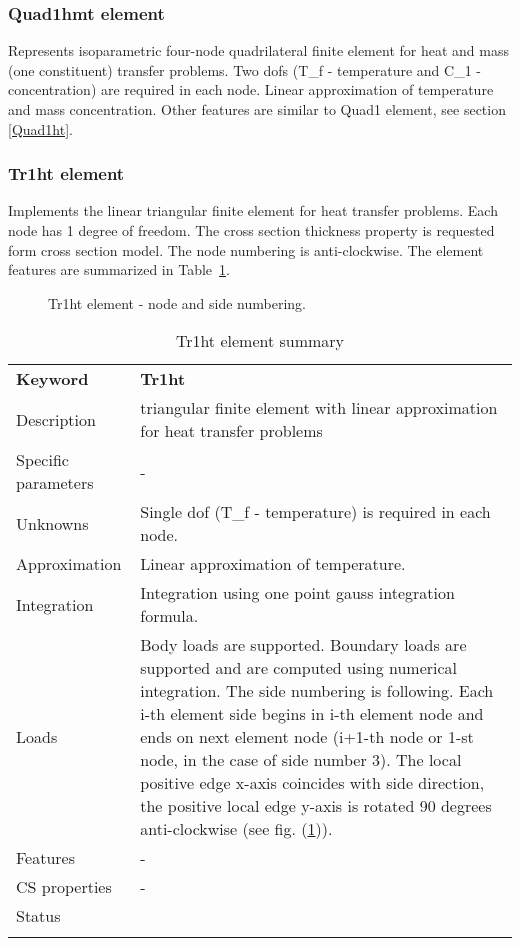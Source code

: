 \documentclass[a4paper]{article}
\newcommand{\param}[1]{\texttt{#1}} %
\newcommand{\templabel}{}%
\newcommand{\tempcaption}{}%
\newcounter{nelpar}
\newenvironment{elementsummary}[5]{%
  \gdef\tempcaption{#4}%
  \gdef\templabel{#5}%
  \setcounter{nelpar}{0}%
  \begin{center} %
    \begin{table}[!htb] %
      \begin{tabular}{|l|p{9cm}|}\hline %
        {\bf Keyword} & \bf{#1}\\ %
        {Description} & {#2}\\ %
        {Specific parameters} & {#3}\\ \hline %
}{
  \\ \hline %
      \end{tabular}%
      \caption{\tempcaption}%
      \label{\templabel}%
    \end{table}%
  \end{center}%
}
\newcommand{\elementParam}[1]{%
  \ifthenelse{\value{nelpar}>0} %
             {&{#1}}%
             {\setcounter{nelpar}{1}Parameters&{#1}}%
             \\%
}
\newcommand{\elementDescription}[2]{{#1} & {#2}\\ }
\begin{document}
\subsubsection{Quad1hmt element}
Represents isoparametric four-node quadrilateral finite element for
heat and mass (one constituent) transfer problems. 
Two dofs (T\_f - temperature and C\_1 - concentration) are required in
each node. Linear approximation of temperature and mass concentration.
Other features are similar to Quad1 element, see section \ref{Quad1ht}.

\subsubsection{Tr1ht element}
\label{Tr1ht}
Implements the linear triangular finite element for heat transfer problems. Each node has 1 degree of freedom.
The cross section thickness property is requested form cross section model.
The node numbering is anti-clockwise. The element features are summarized in Table~\ref{Tr1htsummary}.

\begin{figure}[htb]
 \centering
 \begin{makeimage}
  
 \end{makeimage}
 \caption{Tr1ht element - node and side numbering.}
 \label{Tr1htfig}
\end{figure}

\begin{elementsummary}{Tr1ht}{triangular finite element with linear approximation for heat transfer problems}{-}{Tr1ht element summary}{Tr1htsummary}
\elementDescription{Unknowns}{Single dof (T\_f - temperature) is required in each node.}
\elementDescription{Approximation}{Linear approximation of temperature.}
\elementDescription{Integration}{Integration using one point gauss integration formula.}
\elementDescription{Loads}{Body loads are supported. Boundary loads are
supported and are computed  using numerical integration. The side numbering is
following. Each i-th element side begins in i-th element node and
ends on next element node (i+1-th node or 1-st node, in the case of 
side number 3). The local positive edge x-axis coincides with side
direction, the positive local edge y-axis is rotated 90 degrees
anti-clockwise (see fig. (\ref{Tr1htfig})).}
\elementDescription{Features}{-}
\elementDescription{CS properties}{-}
\elementDescription{Status}{}
\end{elementsummary}
\end{document}
